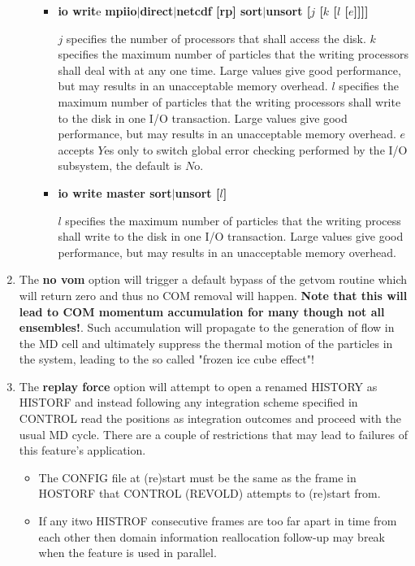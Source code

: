 \begin{enumerate}
\begin{enumerate}
\begin{itemize}
\item {\bf io writ}e {\bf mpiio$|$direct$|$netcdf [rp] sort$|$unsort [$j$ [$k$ [$l$ [$e$]]]]}

$j$ specifies the number of processors that shall access
the disk.  $k$ specifies the maximum number of particles
that the writing processors shall deal with at any one time.
Large values give good performance, but may results in an
unacceptable memory overhead.  $l$ specifies the maximum
number of particles that the writing processors shall
write to the disk in one I/O transaction.  Large values
give good performance, but may results in an unacceptable
memory overhead.  $e$ accepts $Y$es only to switch global
error checking performed by the I/O subsystem, the default
is $N$o.

\item {\bf io write master sort$|$unsort [$l$]}

$l$ specifies the maximum number of particles that the
writing process shall write to the disk in one I/O
transaction.  Large values give good performance, but may
results in an unacceptable memory overhead.
\end{itemize}
\end{enumerate}

\item The {\bf no vom} option will trigger a default bypass of
the {\sc getvom} routine which will return zero and thus no COM
removal will happen.  {\bf Note that this will lead to COM momentum
accumulation for many though not all ensembles!}.  Such accumulation
will propagate to the generation of flow in the MD cell and ultimately
suppress the thermal motion of the particles in the system, leading to
the so called "frozen ice cube effect"!

\item The {\bf replay force} option will attempt to open a renamed
HISTORY as HISTORF and instead following any integration scheme specified
in CONTROL read the positions as integration outcomes and proceed with
the usual MD cycle.  There are a couple of restrictions that may lead to
failures of this feature's application.
\begin{itemize}
\item The CONFIG file at (re)start must be the same as the frame
in HOSTORF that CONTROL (REVOLD) attempts to (re)start from.

\item If any itwo HISTROF consecutive frames are too far apart in
time from each other then domain information reallocation follow-up
may break when the feature is used in parallel.
\end{itemize}
\end{enumerate}

